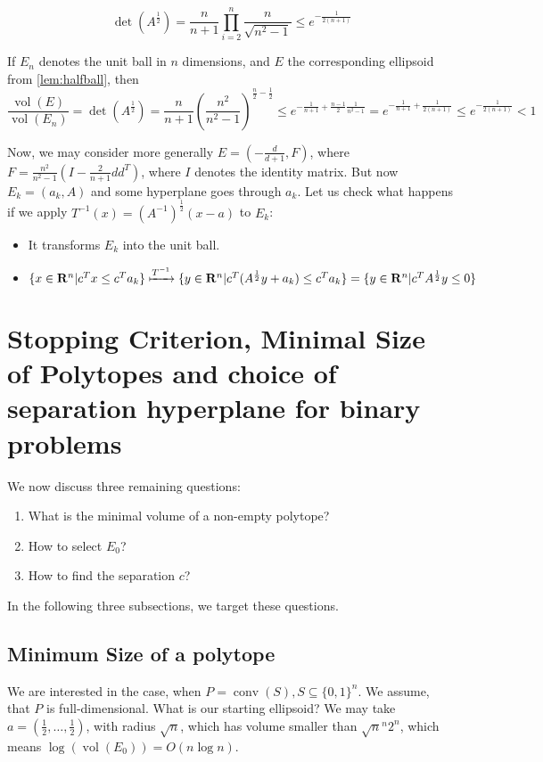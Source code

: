 \documentclass[10pt]{article}
\newcommand{\R}{\mathbf{R}}
\newcommand{\transpose}{T}
\newcommand{\vol}{\operatorname{vol}}
\newcommand{\conv}{\operatorname{conv}}
\begin{document}
\[
\det (A^{\frac{1}{2}}) = \frac{n}{n+1}\prod_{i=2}^n \frac{n}{\sqrt{n^2-1}} \le e^{-\frac{1}{2(n+1)}}
\]
\begin{corollary}
If $E_n$ denotes the unit ball in $n$ dimensions, and $E$ the corresponding ellipsoid from \autoref{lem:halfball}, then
\[
\frac{\vol (E)}{\vol (E_n)} = \det (A^{\frac{1}{2}}) = \frac{n}{n+1} \left(\frac{n^2}{n^2-1}\right)^{\frac{n}{2}-\frac{1}{2}} \le e^{-\frac{1}{n+1} + \frac{n-1}{2} \frac{1}{n^2-1}} = e^{-\frac{1}{n+1} + \frac{1}{2(n+1)}} \le e^{-\frac{1}{2(n+1)}}<1
\]
\end{corollary}
Now, we may consider more generally $E = (-\frac{d}{d+1}, F)$, where $F = \frac{n^2}{n^2-1} (I - \frac{2}{n+1} dd^\transpose)$, where $I$ denotes the identity matrix. But now $E_k = (a_k, A)$ and some hyperplane goes through $a_k$.  Let us check what happens if we apply $T^{-1} (x) = (A^{-1})^{\frac{1}{2}} (x-a)$ to $E_k$:
\begin{itemize}
\item It transforms $E_k$ into the unit ball. 
\item $\{x\in \R^n | c^\transpose x \le c^\transpose a_k \} \xmapsto{T^{-1}} \{y\in \R^n | c^\transpose (A^{\frac{1}{2}} y + a_k ) \le c^\transpose a_k\} = \{y \in \R^n | c^\transpose A^{\frac{1}{2}} y \le 0 \}$
\end{itemize}

\section{Stopping Criterion, Minimal Size of Polytopes and choice of separation hyperplane for binary problems}
We now discuss three remaining questions:
\begin{enumerate}
\item What is the minimal volume of a non-empty polytope?
\item How to select $E_0$?
\item How to find the separation $c$?
\end{enumerate}
In the following three subsections, we target these questions.
\subsection{Minimum Size of a polytope}
We are interested in the case, when $P = \conv (S), S \subseteq \{0,1\}^n$. We assume, that $P$ is full-dimensional. What is our starting ellipsoid? We may take $a = (\frac{1}{2}, \dots, \frac{1}{2})$, with radius $\sqrt{n}$, which has volume smaller than $\sqrt{n}^{n} 2^n$, which means $\log (\vol (E_0)) = O(n \log n)$. 
\end{document}
